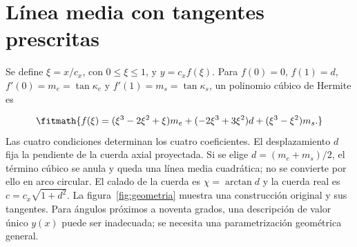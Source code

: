 \documentclass[10pt,openany]{book}
\begin{document}
\section{Línea media con tangentes prescritas}

Se define \(\xi=x/c_x\), con \(0\leq\xi\leq1\), y \(y=c_xf(\xi)\). Para \(f(0)=0\), \(f(1)=d\), \(f'(0)=m_e=\tan\kappa_e\) y \(f'(1)=m_s=\tan\kappa_s\), un polinomio cúbico de Hermite es

\[
\fitmath{f(\xi)=(\xi^3-2\xi^2+\xi)m_e+(-2\xi^3+3\xi^2)d+(\xi^3-\xi^2)m_s.}
\]
Las cuatro condiciones determinan los cuatro coeficientes. El desplazamiento \(d\) fija la pendiente de la cuerda axial proyectada. Si se elige \(d=(m_e+m_s)/2\), el término cúbico se anula y queda una línea media cuadrática; no se convierte por ello en arco circular.
El calado de la cuerda es \(\chi=\arctan d\) y la cuerda real es \(c=c_x\sqrt{1+d^2}\). La figura~\ref{fig:geometria} muestra una construcción original y sus tangentes. Para ángulos próximos a noventa grados, una descripción de valor único \(y(x)\) puede ser inadecuada; se necesita una parametrización geométrica general.
\end{document}

